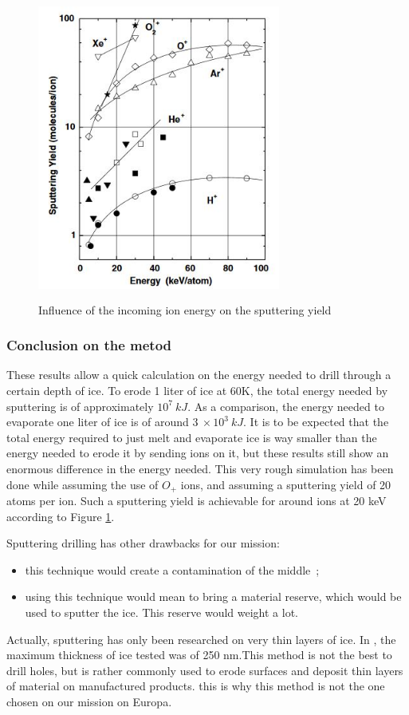\begin{figure}[htb]
\centering
\includegraphics[width=8cm, height=10cm, clip]{figures/Paul/sputteringenergy.JPG}
\caption{Influence of the incoming ion energy on the sputtering yield}
\label{sputteringenergy}
\end{figure}


\subsubsection{Conclusion on the metod}

These results allow a quick calculation on the energy needed to drill through a certain depth of ice. To erode 1 liter of ice at 60K, the total energy needed by sputtering is of approximately $10^{7}~kJ$. As a comparison, the energy needed to evaporate one liter of ice is of around $3~\times10^{3}~kJ$. It is to be expected that the total energy required to just melt and evaporate ice is way smaller than the energy needed to erode it by sending ions on it, but these results still show an enormous difference in the energy needed. This very rough simulation has been done while assuming the use of $O_{+}$ ions, and assuming a sputtering yield of 20 atoms per ion. Such a sputtering yield is achievable for around ions at 20 keV according to Figure \ref{sputteringenergy}.

Sputtering drilling has other drawbacks for our mission:
\begin{itemize}
\item{this technique would create a contamination of the middle~;}
\item{using this technique would mean to bring a material reserve, which would be used to sputter the ice. This reserve would weight a lot.}
\end{itemize}

Actually, sputtering has only been researched on very thin layers of ice. In \cite{baragiola2003sputtering}, the maximum thickness of ice tested was of 250 nm.This method is not the best to drill holes, but is rather commonly used to erode surfaces and deposit thin layers of material on manufactured products. this is why this method is not the one chosen on our mission on Europa.